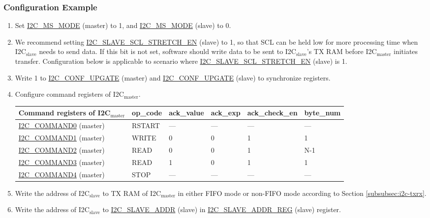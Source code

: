 \documentclass[main\_\_EN.tex]{subfiles}
\begin{document}
\subsubsection{Configuration Example}
\begin{enumerate}
\item Set \hyperref[fielddesc:I2CMSMODE]{I2C\_MS\_MODE} (master) to 1, and \hyperref[fielddesc:I2CMSMODE]{I2C\_MS\_MODE} (slave) to 0.
\item We recommend setting \hyperref[fielddesc:I2CSLAVESCLSTRETCHEN]{I2C\_SLAVE\_SCL\_STRETCH\_EN} (slave) to 1, so that SCL can be held low for more processing time when I2C$_\text{slave}$ needs to send data. If this bit is not set, software should write data to be sent to I2C$_\text{slave}$'s TX RAM before I2C$_\text{master}$ initiates transfer. Configuration below is applicable to scenario where \hyperref[fielddesc:I2CSLAVESCLSTRETCHEN]{I2C\_SLAVE\_SCL\_STRETCH\_EN} (slave) is 1.
\item Write 1 to \hyperref[fielddesc:I2CCONFUPGATE]{I2C\_CONF\_UPGATE} (master) and \hyperref[fielddesc:I2CCONFUPGATE]{I2C\_CONF\_UPGATE} (slave) to synchronize registers.
\item Configure command registers of I2C$_\text{master}$.
\begin{longtable}{ | p{4cm} | p{2cm} | p{2cm} | p{2cm} |p{2cm} | p{2cm} |}
\hline\rowcolor{lightgray}
Command registers of I2C$_\text{master}$& op\_code & ack\_value&ack\_exp&ack\_check\_en&byte\_num  \\ \hline
\hyperref[fielddesc:I2CCOMMAND0]{I2C\_COMMAND0} (master)& RSTART& ---&---&---&---  \\ \hline
\hyperref[fielddesc:I2CCOMMAND1]{I2C\_COMMAND1} (master)& WRITE& 0&0&1&1  \\ \hline
\hyperref[fielddesc:I2CCOMMAND2]{I2C\_COMMAND2} (master)& READ& 0&0&1&N-1  \\ \hline
\hyperref[fielddesc:I2CCOMMAND3]{I2C\_COMMAND3} (master)& READ& 1&0&1&1  \\ \hline
\hyperref[fielddesc:I2CCOMMAND4]{I2C\_COMMAND4} (master)& STOP& ---&---&---&---  \\ \hline
\end{longtable}
\item Write the address of I2C$_\text{slave}$ to TX RAM of I2C$_\text{master}$ in either FIFO mode or non-FIFO mode according to Section \ref{subsubsec:i2c-txrx}.
\item Write the address of I2C$_\text{slave}$ to \hyperref[fielddesc:I2CSLAVEADDR]{I2C\_SLAVE\_ADDR} (slave) in \hyperref[regdesc:I2CSLAVEADDRREG]{I2C\_SLAVE\_ADDR\_REG} (slave) register.

\end{enumerate}
\end{document}
